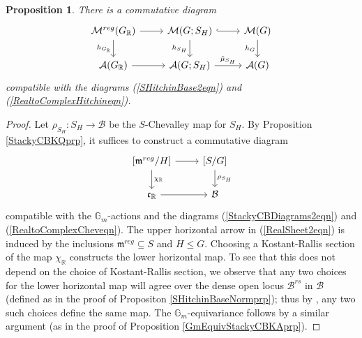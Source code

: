 \documentclass{amsart}
\newtheorem{proposition}[theorem]{Proposition}
\theoremstyle{remark}
\numberwithin{theorem}{section}
\numberwithin{equation}{section}
\begin{document}
\begin{proposition}\label{RealSheetprp}
    There is a commutative diagram
\begin{equation}\label{RealSheet1eqn}
\begin{tikzcd}
{\mathcal M^{reg}(G_{\mathbb{R}})} \arrow[r] \arrow[d, "h_{G_{\mathbb{R}}}"'] & {\mathcal M(G;S_H)} \arrow[r, hook] \arrow[d, "h_{S_H}"'] & {\mathcal M(G)} \arrow[d, "h_G"'] \\
{\mathcal A(G_{\mathbb{R}})} \arrow[r]                             & {\mathcal A( G;{S_H})} \arrow[r, "\tilde{\mu}_{S_H}"]                  & {\mathcal A(G)}               
\end{tikzcd}
\end{equation}
compatible with the diagrams (\ref{SHitchinBase2eqn}) and (\ref{RealtoComplexHitchineqn}).
\end{proposition}

\begin{proof} 
Let $\rho_{S_H}:S_H \rightarrow \mathcal B$ be the $S$-Chevalley map for $S_H$. By Proposition \ref{StackyCBKQprp}, it suffices to construct a commutative diagram
\begin{equation}\label{RealSheet2eqn}
    \begin{tikzcd}
{[\mathfrak{m}^{reg}/H]} \arrow[r] \arrow[d, "\chi_\mathbb{R}"] & {[S/G]} \arrow[d, "\rho_{S_H}"] \\
\mathfrak{c}_\mathbb{R} \arrow[r]           & \mathcal B 
\end{tikzcd}
\end{equation}
compatible with the $\mathbb{G}_m$-actions and the diagrams (\ref{StackyCBDiagrams2eqn}) and (\ref{RealtoComplexCheveqn}). The upper horizontal arrow in (\ref{RealSheet2eqn}) is induced by the inclusions $\mathfrak{m}^{reg} \subseteq S$ and $H \leq G$. Choosing a Kostant-Rallis section of the map $\chi_{\mathbb{R}}$ \cite[Theorems 11, 12 and 13]{KR} constructs the lower horizontal map. To see that this does not depend on the choice of Kostant-Rallis section, we observe that any two choices for the lower horizontal map will agree over the dense open locus $\mathcal B^{rs}$ in $\mathcal B$ (defined as in the proof of Propositon \ref{SHitchinBaseNormprp}); thus by \cite[Proposition A.1]{FMN}, any two such choices define the same map. The $\mathbb{G}_m$-equivariance follows by a similar argument (as in the proof of Proposition \ref{GmEquivStackyCBKAprp}).
\end{proof}
\end{document}
